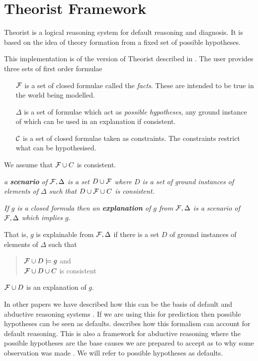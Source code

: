\section{Theorist Framework} \label{theorist}

Theorist \cite{poole:lf,pga} is a logical reasoning system for default reasoning
and diagnosis. It is based on the idea of theory formation from a fixed
set of possible hypotheses.

This implementation is of the version of Theorist described in \cite{poole:lf}.
The user provides three sets of first order formulae
\begin{itemize}
\item[${\cal F}$] is a set of closed formulae called the {\em facts\/}.
These are intended to be true in the world being modelled.
\item[$\Delta$] is a set of formulae which
act as {\em possible hypotheses}, any ground instance of which
can be used in an explanation if consistent.
\item[$\cal C$] is a set of closed formulae taken as constraints.
The constraints restrict what can be hypothesised.
\end{itemize}

We assume that ${\cal F}\cup C$ is consistent.

\begin{definition} \em
a {\bf  scenario} of ${\cal F},\Delta$ is a set $D \cup {\cal F}$ where
$D$ is a set of ground instances of elements
of $\Delta$ such that $D\cup {\cal F} \cup C$ is consistent.
\end{definition}

\begin{definition} \em
If $g$ is a closed formula then an {\bf explanation} of $g$ from ${\cal F},\Delta$
is a  scenario of ${\cal F},\Delta$ which implies $g$.
\end{definition}
That is, $g$ is explainable from ${\cal F},\Delta$ if there is a set
$D$ of ground instances of elements of $\Delta$ such that
\begin{quote}
${\cal F} \cup D \models g$ and\\
${\cal F} \cup D \cup C$ is consistent
\end{quote}
${\cal F} \cup D$ is an explanation of $g$.

In other papers we have described how this can be the basis of
default and abductive reasoning systems \cite{pga,poole:lf,poole:dc,poole:dd}.
If we are using this for prediction then possible hypotheses can be seen
as defaults. \cite{poole:lf} describes how this formalism can account
for default reasoning. This is also a framework for abductive reasoning
where the possible hypotheses are the base causes we are prepared
to accept as to why some observation was made \cite{pga}.
We will refer to possible hypotheses as defaults.

